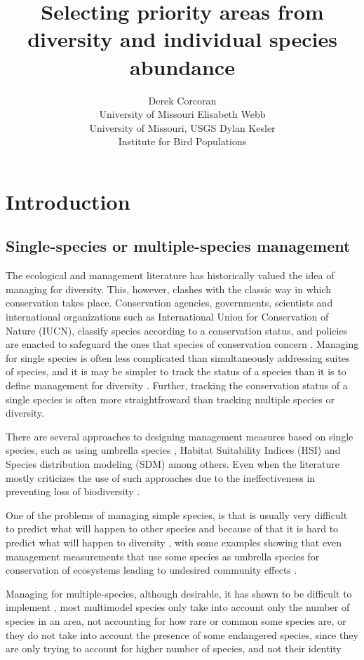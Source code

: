 \documentclass[article]{jss}
\author{
Derek Corcoran\\University of Missouri \And Elisabeth Webb\\University of Missouri, USGS \And Dylan Kesler\\Institute for Bird Populations
}
\title{Selecting priority areas from diversity and individual species abundance
\pkg{DiversityOccupancy}}
\begin{document}
\section{Introduction}\label{introduction}

\subsection{Single-species or multiple-species
management}\label{single-species-or-multiple-species-management}

The ecological and management literature has historically valued the
idea of managing for diversity. This, however, clashes with the classic
way in which conservation takes place. Conservation agencies,
governments, scientists and international organizations such as
International Union for Conservation of Nature (IUCN), classify species
according to a conservation status, and policies are enacted to
safeguard the ones that species of conservation concern
\citep{keller2004red, rodrigues2006value}. Managing for single species
is often less complicated than simultaneously addressing suites of
species, and it is may be simpler to track the status of a species than
it is to define management for diversity
\citep{simberloff1998flagships}. Further, tracking the conservation
status of a single species is often more straightfroward than tracking
multiple species or diversity.

There are several approaches to designing management measures based on
single species, such as using umbrella species
\citep{crosby2015looking, bichet2016maintaining}, Habitat Suitability
Indices (HSI)
\citep{reza2013integrating, soniat2013predicting, zohmann2013modelling}
and Species distribution modeling (SDM)
\citep{peterson2011ecological, guisan2013predicting} among others. Even
when the literature mostly criticizes the use of such approaches due to
the ineffectiveness in preventing loss of biodiversity
\citep{roberge2004usefulness, branton2011assessing}.

One of the problems of managing simple species, is that is usually very
difficult to predict what will happen to other species and because of
that it is hard to predict what will happen to diversity
\citep{pulliam2000relationship}, with some examples showing that even
management measurements that use some species as umbrella species for
conservation of ecosystems leading to undesired community effects
\citep{white2013conservation}.

Managing for multiple-species, although desirable, it has shown to be
difficult to implement
\citep{mollmann2014implementing, lmgren2015baltic}, most multimodel
species only take into account only the number of species in an area,
not accounting for how rare or common some species are, or they do not
take into account the presence of some endangered species, since they
are only trying to account for higher number of species, and not their
identity
\citep{taft2002waterbird, tori2002wetland, plaganyi2014multispecies}
\end{document}
